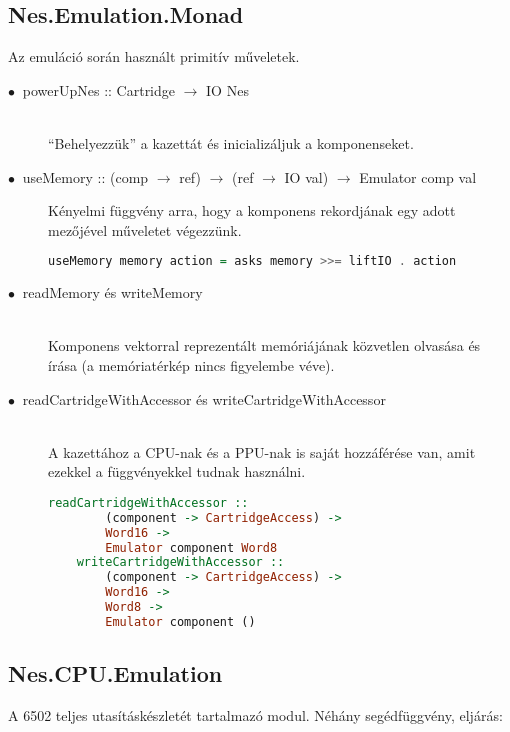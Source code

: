 \subsection{Nes.Emulation.Monad}
Az emuláció során használt primitív műveletek.
\begin{description}
	\item[$\bullet\:$ powerUpNes :: Cartridge $\rightarrow$ IO Nes] \hfill \\
	``Behelyezzük'' a kazettát és inicializáljuk a komponenseket. 
	\item[$\bullet\:$ useMemory :: (comp $\rightarrow$ ref) $\rightarrow$ (ref $\rightarrow$ IO val) $\rightarrow$ Emulator comp val]
	Kényelmi függvény arra, hogy a komponens rekordjának egy adott mezőjével műveletet végezzünk.
	\begin{lstlisting}[language=Haskell]
	useMemory memory action = asks memory >>= liftIO . action
	\end{lstlisting}
	\item[$\bullet\:$ readMemory és writeMemory] \hfill \\
	Komponens vektorral reprezentált memóriájának közvetlen olvasása és írása (a memóriatérkép nincs figyelembe véve).
	\item[$\bullet\:$ readCartridgeWithAccessor és writeCartridgeWithAccessor] \hfill \\
	A kazettához a CPU-nak és a PPU-nak is saját hozzáférése van, amit ezekkel a függvényekkel tudnak használni.
	\begin{lstlisting}[language=Haskell, basicstyle=\scriptsize]
	readCartridgeWithAccessor :: 
		(component -> CartridgeAccess) ->
		Word16 -> 
		Emulator component Word8
	writeCartridgeWithAccessor ::
		(component -> CartridgeAccess) -> 
		Word16 ->
		Word8 -> 
		Emulator component ()
	\end{lstlisting}
\end{description}

\subsection{Nes.CPU.Emulation}
A 6502 teljes utasításkészletét tartalmazó modul. Néhány segédfüggvény, eljárás:

